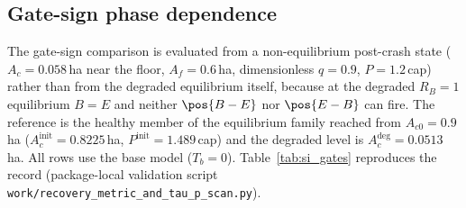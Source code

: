 \begin{table}[htbp]
\centering\small
\caption{Recovery of the capital book after a demand-driven drawdown ($A_{c0}=1.0$\,ha, $A_{f0}=0.6$\,ha, $q_0=0.9$, $T=400$\,yr): initial population $P_0$ is in cap, initial footprint $E_0$ in gha, capital-land values in ha, and the recovery metric is dimensionless.}
\label{tab:si_recovery}

\end{table}

\subsection{Gate-sign phase dependence}\label{si:gates}

The gate-sign comparison is evaluated from a non-equilibrium post-crash state ($A_c=0.058$\,ha near the floor, $A_f=0.6$\,ha, dimensionless $q=0.9$, $P=1.2$\,cap) rather than from the degraded equilibrium itself, because at the degraded $R_B=1$ equilibrium $B=E$ and neither $\pos{B-E}$ nor $\pos{E-B}$ can fire. The reference is the healthy member of the equilibrium family reached from $A_{c0}=0.9$\,ha ($A_c^{\mathrm{init}}=0.8225$\,ha, $P^{\mathrm{init}}=1.489$\,cap) and the degraded level is $A_c^{\mathrm{deg}}=0.0513$\,ha. All rows use the base model ($T_b=0$). Table~\ref{tab:si_gates} reproduces the record (package-local validation script \texttt{work/recovery\_metric\_and\_tau\_p\_scan.py}).

